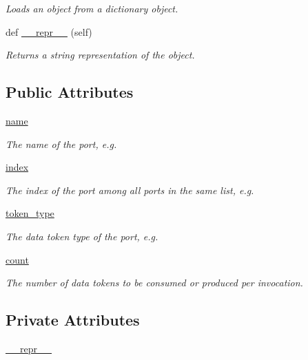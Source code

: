 \begin{DoxyCompactItemize}
\begin{DoxyCompactList}\small\item\em Loads an object from a dictionary object. \end{DoxyCompactList}\item 
def \hyperlink{classsylva_1_1base_1_1sylva__base_1_1_s_y_l_v_a_base_a5bd08c41ab09c380433d0de82fb98860}{\+\_\+\+\_\+repr\+\_\+\+\_\+} (self)
\begin{DoxyCompactList}\small\item\em Returns a string representation of the object. \end{DoxyCompactList}\end{DoxyCompactItemize}
\subsection*{Public Attributes}
\begin{DoxyCompactItemize}
\item 
\hyperlink{classsylva_1_1base_1_1sdf_1_1_port_aa8aa0ac5a7e375e2c0cb6e92a0b1dd20}{name}
\begin{DoxyCompactList}\small\item\em The name of the port, e.\+g. \end{DoxyCompactList}\item 
\hyperlink{classsylva_1_1base_1_1sdf_1_1_port_abbfd66f762649b6a8105657259471c5a}{index}
\begin{DoxyCompactList}\small\item\em The index of the port among all ports in the same list, e.\+g. \end{DoxyCompactList}\item 
\hyperlink{classsylva_1_1base_1_1sdf_1_1_port_a3bc0e05af490f897794a9781127c69e3}{token\+\_\+type}
\begin{DoxyCompactList}\small\item\em The data token type of the port, e.\+g. \end{DoxyCompactList}\item 
\hyperlink{classsylva_1_1base_1_1sdf_1_1_port_aec009757acfd92df95b273c671cac068}{count}
\begin{DoxyCompactList}\small\item\em The number of data tokens to be consumed or produced per invocation. \end{DoxyCompactList}\end{DoxyCompactItemize}
\subsection*{Private Attributes}
\begin{DoxyCompactItemize}
\item 
\hyperlink{classsylva_1_1base_1_1sdf_1_1_port_a1d6e4ff7796c0ecdd2fc39b12fb15494}{\+\_\+\+\_\+repr\+\_\+\+\_\+}
\end{DoxyCompactItemize}


